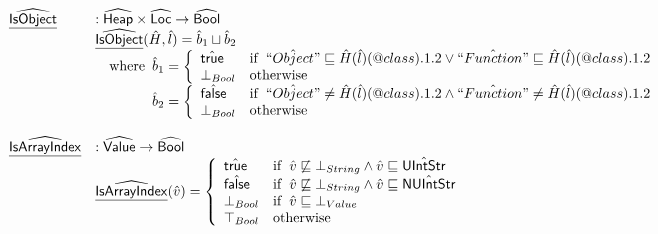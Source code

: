 \documentclass{article}
\makeatletter
\newcommand{\SF}[1]{\mbox{\textsf{#1}}}
\newcommand{\wherec}[1]{{\rm where}\begin{array}[t]{l}#1\end{array}}
\newcommand{\ifc}[1]{{\rm if}\begin{array}[t]{l}#1\end{array}}
\newcommand{\owc}{{\rm otherwise}}
\newcommand{\abs}[1]{\widehat{\SF{#1}}}
\newcommand{\aHeap}{\abs{Heap}}
\newcommand{\aLoc}{\abs{Loc}}
\newcommand{\aValue}{\abs{Value}}
\newcommand{\ahf}[1]{\widehat{\underline{\sf #1}}}
\newcommand{\varprop}[1]{@#1}
\newcommand{\atrue}{\hat{\SF{true}}}
\newcommand{\afalse}{\hat{\SF{false}}}
\makeatother
\begin{document}
\[
\begin{array}{ll}
\ahf{IsObject} & : \aHeap \times \aLoc \rightarrow \abs{Bool} \\
& \ahf{IsObject}(\hat{H},\hat{l}) = \hat{b}_1\sqcup\hat{b}_2\\
& \quad\wherec{
    \hat{b}_1=\left\{
      \begin{array}{ll}
        \atrue &\ifc{\hat{``Object"} \sqsubseteq \hat{H}(\hat{l})(\varprop{class}).1.2 \lor
          \hat{``Function"} \sqsubseteq \hat{H}(\hat{l})(\varprop{class}).1.2
        }\\
        \bot_{Bool} & \owc \\
      \end{array}
    \right.\\
    \hat{b}_2 = \left\{
      \begin{array}{ll}
        \afalse & \ifc{\hat{``Object"} \neq \hat{H}(\hat{l})(\varprop{class}).1.2 \land
          \hat{``Function"} \neq \hat{H}(\hat{l})(\varprop{class}).1.2
        }\\
        \bot_{Bool} & \owc\\
      \end{array}
    \right.\\
}\\
\\

\ahf{IsArrayIndex} & : \aValue \rightarrow \abs{Bool} \\
& \ahf{IsArrayIndex}(\hat{v}) = \left\{
      \begin{array}{ll}
        \atrue
        &\ifc{\hat{v}\not\sqsubseteq\bot_{String} \land \hat{v}\sqsubseteq\hat{\SF{UIntStr}} \\
        }\\
        \afalse
        & \ifc{\hat{v}\not\sqsubseteq\bot_{String} \land \hat{v}\sqsubseteq\hat{\SF{NUIntStr}} \\
        }\\
        \bot_{Bool} & \ifc{\hat{v}\sqsubseteq\bot_{Value}} \\
        \top_{Bool} & \owc \\
      \end{array}
    \right.\\
\\


\end{array}\]
\end{document}
